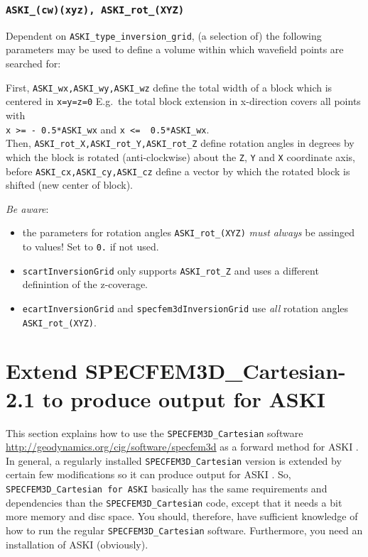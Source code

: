 \documentclass[12pt,a4paper]{article}
\newcommand{\lcode}[1]{\nolinkurl{#1}}
\newcommand{\lcodetitle}[1]{ {\ttfamily #1} }
\newcommand{\ASKI}{ {\ttfamily ASKI} }
\begin{document}
\subsubsection*{\lcode{ASKI_(cw)(xyz), ASKI_rot_(XYZ)}}
Dependent on \lcode{ASKI_type_inversion_grid}, (a selection of) the following parameters may be used to define a volume 
within which wavefield points are searched for:

First, \lcode{ASKI_wx,ASKI_wy,ASKI_wz} define the total width of a block which is centered in \lcode{x=y=z=0}
E.g.\ the total block extension in x-direction covers all points with\\
\lcode{x >= - 0.5*ASKI_wx} and \lcode{x <=  0.5*ASKI_wx}.\\
Then, \lcode{ASKI_rot_X,ASKI_rot_Y,ASKI_rot_Z} define rotation angles in degrees by which the block is 
rotated (anti-clockwise) about the \lcode{Z}, \lcode{Y} and \lcode{X} coordinate axis, before 
\lcode{ASKI_cx,ASKI_cy,ASKI_cz} define a vector by which the rotated block is shifted (new center of block).

\emph{Be aware}:
\begin{itemize}
\item the parameters for rotation angles \lcode{ASKI_rot_(XYZ)} \emph{must always} be assinged to values! 
  Set to \lcode{0.} if not used.
\item \lcode{scartInversionGrid} only supports \lcode{ASKI_rot_Z} and uses a different definintion of the z-coverage.
\item \lcode{ecartInversionGrid} and \lcode{specfem3dInversionGrid} use \emph{all} rotation angles \lcode{ASKI_rot_(XYZ)}.
\end{itemize}
%
\section{Extend \lcodetitle{SPECFEM3D\_Cartesian-2.1} to produce output for \ASKI} \label{extent_to_ASKI}
%
This section explains how to use the \lcode{SPECFEM3D_Cartesian} software 
\url{http://geodynamics.org/cig/software/specfem3d} as a forward method for \ASKI. In general, a regularly
installed \lcode{SPECFEM3D_Cartesian} version is extended by certain few modifications so it can produce
output for \ASKI. So, \lcode{SPECFEM3D_Cartesian for ASKI} basically has the same requirements and dependencies 
than the \lcode{SPECFEM3D_Cartesian} code, except that it needs a bit more memory and disc space. You should, 
therefore, have sufficient knowledge of how to run the regular \lcode{SPECFEM3D_Cartesian} software. Furthermore, 
you need an installation of \ASKI (obviously).
%
\end{document}
